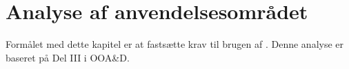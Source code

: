 \chapter{Analyse af anvendelsesområdet}
\label{chap:analyseafao}

Formålet med dette kapitel er at fastsætte krav til brugen af \Foodl. Denne analyse er baseret på Del III i OOA\&D.




